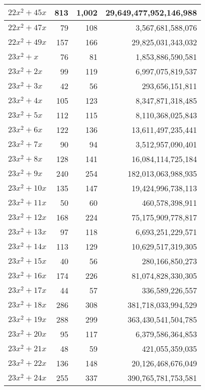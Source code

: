 \documentclass[a4paper]{amsproc}
\theoremstyle{plain}
\begin{document}
\begin{longtable}{ | l | r | r | r | }
$22x^2 + 45x$ & 813 & 1{,}002 & 29{,}649{,}477{,}952{,}146{,}988 \\ \hline
$22x^2 + 47x$ & 79 & 108 & 3{,}567{,}681{,}588{,}076 \\ \hline
$22x^2 + 49x$ & 157 & 166 & 29{,}825{,}031{,}343{,}032 \\ \hline
$23x^2 + x$ & 76 & 81 & 1{,}853{,}886{,}590{,}581 \\ \hline
$23x^2 + 2x$ & 99 & 119 & 6{,}997{,}075{,}819{,}537 \\ \hline
$23x^2 + 3x$ & 42 & 56 & 293{,}656{,}151{,}811 \\ \hline
$23x^2 + 4x$ & 105 & 123 & 8{,}347{,}871{,}318{,}485 \\ \hline
$23x^2 + 5x$ & 112 & 115 & 8{,}110{,}368{,}025{,}843 \\ \hline
$23x^2 + 6x$ & 122 & 136 & 13{,}611{,}497{,}235{,}441 \\ \hline
$23x^2 + 7x$ & 90 & 94 & 3{,}512{,}957{,}090{,}401 \\ \hline
$23x^2 + 8x$ & 128 & 141 & 16{,}084{,}114{,}725{,}184 \\ \hline
$23x^2 + 9x$ & 240 & 254 & 182{,}013{,}063{,}988{,}935 \\ \hline
$23x^2 + 10x$ & 135 & 147 & 19{,}424{,}996{,}738{,}113 \\ \hline
$23x^2 + 11x$ & 50 & 60 & 460{,}578{,}398{,}911 \\ \hline
$23x^2 + 12x$ & 168 & 224 & 75{,}175{,}909{,}778{,}817 \\ \hline
$23x^2 + 13x$ & 97 & 118 & 6{,}693{,}251{,}229{,}571 \\ \hline
$23x^2 + 14x$ & 113 & 129 & 10{,}629{,}517{,}319{,}305 \\ \hline
$23x^2 + 15x$ & 40 & 56 & 280{,}166{,}850{,}273 \\ \hline
$23x^2 + 16x$ & 174 & 226 & 81{,}074{,}828{,}330{,}305 \\ \hline
$23x^2 + 17x$ & 44 & 57 & 336{,}589{,}226{,}557 \\ \hline
$23x^2 + 18x$ & 286 & 308 & 381{,}718{,}033{,}994{,}529 \\ \hline
$23x^2 + 19x$ & 288 & 299 & 363{,}430{,}541{,}504{,}785 \\ \hline
$23x^2 + 20x$ & 95 & 117 & 6{,}379{,}586{,}364{,}853 \\ \hline
$23x^2 + 21x$ & 48 & 59 & 421{,}055{,}359{,}035 \\ \hline
$23x^2 + 22x$ & 136 & 148 & 20{,}126{,}468{,}676{,}049 \\ \hline
$23x^2 + 24x$ & 255 & 337 & 390{,}765{,}781{,}753{,}581 \\ \hline

\end{longtable}
\end{document}
